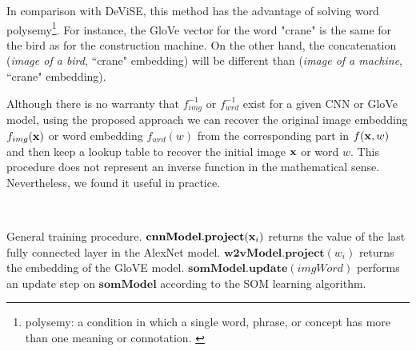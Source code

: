 \documentclass[a4paper]{standalone}
\begin{document}
In comparison with DeViSE, this method has the advantage of solving word polysemy\footnote{polysemy: a condition in which a single word, phrase, or concept has more than one meaning or connotation. \cite{dictionaryCom}}. For instance, the GloVe vector for the word "crane" is the same for the bird as for the construction machine. On the other hand, the concatenation (\emph{image of a bird}, ``crane" embedding) will be different than (\emph{image of a machine}, ``crane" embedding).

Although there is no warranty that $f^{-1}_{img}$ or $f^{-1}_{wrd}$ exist for a given CNN or GloVe model, using the proposed approach we can recover the original image embedding $f_{img}(\mathbf{x})$ or word embedding $f_{wrd}(w)$ from the corresponding part in $f(\mathbf{x}, w)$ and then keep a lookup table to recover the initial image $\mathbf{x}$ or word $w$. This procedure does not represent an inverse function in the mathematical sense. Nevertheless, we found it useful in practice.

\begin{algorithm}
    \\
    \caption{General training procedure. $\mathbf{cnnModel.project}(\mathbf{x}_i)$ returns the value of the last fully connected layer in the AlexNet model. $\mathbf{w2vModel.project}(w_i)$ returns the embedding of the GloVE model. $\mathbf{somModel.update}(imgWord)$ performs an update step on $\mathbf{somModel}$  according to the SOM learning algorithm.}\label{alg:TrainSOM}
\end{algorithm}
\end{document}
